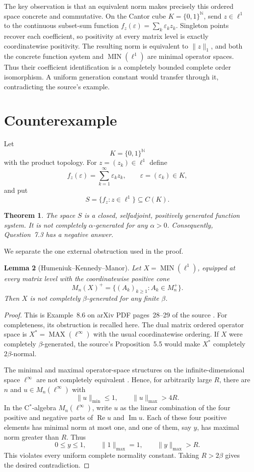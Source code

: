\documentclass[11pt]{article}
\newtheorem{theorem}{Theorem}
\newtheorem{lemma}[theorem]{Lemma}
\theoremstyle{definition}
\newcommand{\MIN}{\operatorname{MIN}}
\newcommand{\MAX}{\operatorname{MAX}}
\begin{document}
The key observation is that an equivalent norm makes precisely this ordered
space concrete and commutative.  On the Cantor cube $K=\{0,1\}^{\mathbb N}$,
send $z\in\ell^1$ to the continuous subset-sum function
$f_z(\varepsilon)=\sum_k\varepsilon_kz_k$.  Singleton points recover each
coefficient, so positivity at every matrix level is exactly coordinatewise
positivity.  The resulting norm is equivalent to $\|z\|_1$, and both the
concrete function system and $\MIN(\ell^1)$ are minimal operator spaces.
Thus their coefficient identification is a completely bounded complete order
isomorphism.  A uniform generation constant would transfer through it,
contradicting the source's example.

\section{Counterexample}

Let
\[
  K=\{0,1\}^{\mathbb N}
\]
with the product topology.  For $z=(z_k)\in\ell^1$ define
\[
  f_z(\varepsilon)=\sum_{k=1}^{\infty}\varepsilon_k z_k,
  \qquad \varepsilon=(\varepsilon_k)\in K,
\]
and put
\[
  S=\{f_z:z\in\ell^1\}\subseteq C(K).
\]

\begin{theorem}
The space $S$ is a closed, selfadjoint, positively generated function system.
It is not completely $\alpha$-generated for any $\alpha>0$.  Consequently,
Question~7.3 has a negative answer.
\end{theorem}

We separate the one external obstruction used in the proof.

\begin{lemma}[Humeniuk--Kennedy--Manor]
Let $X=\MIN(\ell^1)$, equipped at every matrix level with the coordinatewise
positive cone
\[
 M_n(X)^+=\{(A_k)_{k\geq1}:A_k\in M_n^+\}.
\]
Then $X$ is not completely $\beta$-generated for any finite $\beta$.
\end{lemma}

\begin{proof}
This is Example~8.6 on arXiv PDF pages~28--29 of the source \cite{source}.
For completeness, its obstruction is recalled here.  The dual matrix ordered
operator space is $X^*=\MAX(\ell^\infty)$ with the usual coordinatewise
ordering.  If $X$ were completely $\beta$-generated, the source's
Proposition~5.5 would make $X^*$ completely $2\beta$-normal.

The minimal and maximal operator-space structures on the infinite-dimensional
space $\ell^\infty$ are not completely equivalent
\cite[Theorem~14.3]{paulsen}.  Hence, for arbitrarily large $R$, there are
$n$ and $u\in M_n(\ell^\infty)$ with
\[
 \|u\|_{\min}\leq1,
 \qquad \|u\|_{\max}>4R.
\]
In the C$^*$-algebra $M_n(\ell^\infty)$, write $u$ as the linear combination
of the four positive and negative parts of $\operatorname{Re}u$ and
$\operatorname{Im}u$.  Each of these four positive elements has minimal norm
at most one, and one of them, say $y$, has maximal norm greater than $R$.
Thus
\[
 0\leq y\leq 1,
 \qquad \|1\|_{\max}=1,
 \qquad \|y\|_{\max}>R.
\]
This violates every uniform complete normality constant.  Taking
$R>2\beta$ gives the desired contradiction.
\end{proof}
\end{document}

